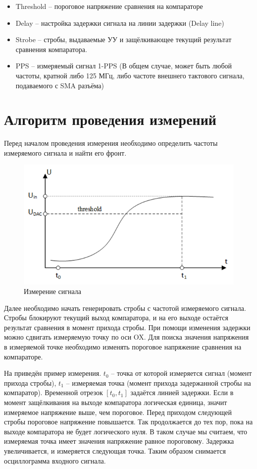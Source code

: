 \begin{itemize}[label={}]
	\item Threshold -- пороговое напряжение сравнения на компараторе
	\item Delay -- настройка задержки сигнала на линии задержки (Delay line)
	\item Strobe -- стробы, выдаваемые УУ и защёлкивающее текущий результат сравнения компаратора.
	\item PPS -- измеряемый сигнал 1-PPS (В общем случае, может быть любой частоты, кратной либо 125 МГц,
		либо частоте внешнего тактового сигнала, подаваемого с SMA разъёма)\\
\end{itemize}

\section{Алгоритм проведения измерений}

Перед началом проведения измерения необходимо определить частоты измеряемого сигнала и найти его фронт.

\begin{figure}[ht!] 
	\center
	\includegraphics {my_folder/images//meas_alg}
	\caption{Измерение сигнала} 
	\label{fig:meas-alg}  
\end{figure}

Далее необходимо начать генерировать стробы с частотой измеряемого сигнала. Стробы блокируют
текущий выход компаратора, и на его выходе остаётся результат сравнения в момент прихода стробы.
При помощи изменения задержки можно сдвигать измеряемую точку по оси OX.
Для поиска значения напряжения в измеряемой точке необходимо изменять пороговое напряжение сравнения
на компараторе.

На  приведён пример измерения. 
$ t_{0} $ -- точка от которой измеряется сигнал (момент прихода стробы),
$ t_{1} $ -- измеряемая точка (момент прихода задержанной стробы на компаратор).
Временной отрезок $ [t_{0}, t_{1}] $ задаётся линией задержки.
Если в момент защёлкивания на выходе компаратора логическая единица, значит измеряемое напряжение выше,
чем пороговое. Перед приходом следующей стробы пороговое напряжение повышается.
Так продолжается до тех пор, пока на выходе компаратора не будет логического нуля.
В таком случае мы считаем, что измеряемая точка имеет значения напряжение равное пороговому.
Задержка увеличивается, и измеряется следующая точка. Таким образом снимается осциллограмма входного сигнала.


